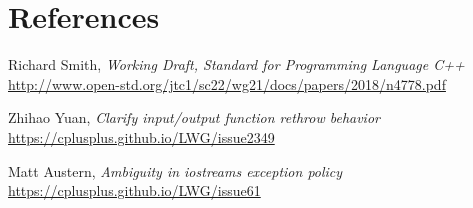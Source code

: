 \documentclass{wg21}
\begin{document}
\section{References}
\renewcommand{\section}[2]{}%
\begin{thebibliography}{9}

  Richard Smith,
  \emph{Working Draft, Standard for Programming Language C++}\newline
  \url{http://www.open-std.org/jtc1/sc22/wg21/docs/papers/2018/n4778.pdf}

  Zhihao Yuan,
  \emph{Clarify input/output function rethrow behavior}\newline
  \url{https://cplusplus.github.io/LWG/issue2349}

  Matt Austern,
  \emph{Ambiguity in iostreams exception policy}\newline
  \url{https://cplusplus.github.io/LWG/issue61}

\end{thebibliography}
\end{document}
